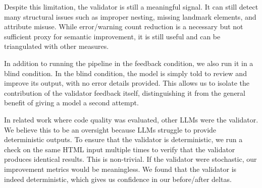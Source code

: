 

Despite this limitation, the validator is still a meaningful signal. It can still detect many structural issues such as improper nesting, missing landmark elements, and attribute misuse. While error/warning count reduction is a necessary but not sufficient proxy for semantic improvement, it is still useful and can be triangulated with other measures.




In addition to running the pipeline in the feedback condition, we also run it in a blind condition. In the blind condition, the model is simply told to review and improve its output, with no error details provided. This allows us to isolate the contribution of the validator feedback itself, distinguishing it from the general benefit of giving a model a second attempt.




In related work where code quality was evaluated, other LLMs were the validator. We believe this to be an oversight because LLMs struggle to provide deterministic outputs. To ensure that the validator is deterministic, we run a check on the same HTML input multiple times to verify that the validator produces identical results. This is non-trivial. If the validator were stochastic, our improvement metrics would be meaningless. We found that the validator is indeed deterministic, which gives us confidence in our before/after deltas.





